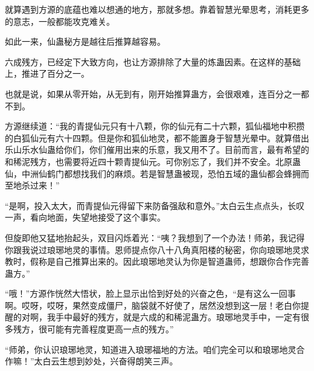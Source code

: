 \begin{this_body}
就算遇到方源的底蕴也难以想通的地方，那就多想。靠着智慧光晕思考，消耗更多的意志，一般都能攻克难关。

如此一来，仙蛊秘方是越往后推算越容易。

六成残方，已经定下大致方向，也让方源排除了大量的炼蛊因素。在这样的基础上，推进了百分之一。

也就是说，如果从零开始，从无到有，刚开始推算蛊方，会很艰难，连百分之一都不到。

方源继续道：“我的青提仙元只有十八颗，你的仙元有二十六颗，狐仙福地中积攒的白狐仙元有六十四颗。但是你和狐仙地灵，都不能置身于智慧光晕中。就算借出乐山乐水仙蛊给你们，你们催用出来的乐意，我又用不了。目前而言，最有希望的和稀泥残方，也需要将近四十颗青提仙元。可你别忘了，我们并不安全。北原蛊仙，中洲仙鹤门都想找我们的麻烦。若是智慧蛊被现，恐怕五域的蛊仙都会蜂拥而至地杀过来！”

“是啊，投入太大，而青提仙元得留下来防备强敌和意外。”太白云生点点头，长叹一声，看向地面，失望地接受了这个事实。

但旋即他又猛地抬起头，双目闪烁着光：“咦？我想到了一个办法！师弟，我记得你跟我说过琅琊地灵的事情。恩师提点你八十八角真阳楼的秘密，你向琅琊地灵求教时，假称是自己推算出来的。因此琅琊地灵认为你是智道蛊师，想跟你合作完善蛊方。”

“哦！”方源作恍然大悟状，脸上显示出恰到好处的兴奋之色，“是有这么一回事啊。哎呀，哎呀，果然变成僵尸，脑袋就不好使了，居然没想到这一层！老白你提醒的对啊，我手中最好的残方，就是六成的和稀泥蛊方。琅琊地灵手中，一定有很多残方，很可能有完善程度更高一点的残方。”

“师弟，你认识琅琊地灵，知道进入琅琊福地的方法。咱们完全可以和琅琊地灵合作嘛！”太白云生想到妙处，兴奋得朗笑三声。

\end{this_body}

